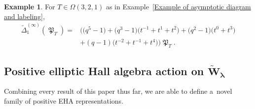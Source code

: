 \documentclass[pdftex]{sigma}
\numberwithin{equation}{section}
\theoremstyle{definition}
\newtheorem{Example}[Theorem]{Example}
\DeclareMathOperator{\MacD}{\mathfrak{P}}
\begin{document}
\begin{Example}
 For $T \in \Omega(3,2,1)$ as in Example~\ref{Example of asymptotic diagram and labeling},
 \begin{align*}
 \widetilde{\Delta}_{1}^{(\infty)}(\MacD_T) ={}& \bigl( \bigl(q^5-1\bigr) + \bigl(q^3-1\bigr)\bigl(t^{-1}+t^1+t^2\bigr) + \bigl(q^2-1\bigr)\bigl(t^0+t^3\bigr)\\
 &+ (q-1)\bigl(t^{-2}+t^{-1}+t^4\bigr)\bigr)\MacD_T.
 \end{align*}

\end{Example}


\subsection[Positive elliptic Hall algebra action on W\_lambda]{Positive elliptic Hall algebra action on $\boldsymbol{\widetilde{W}_{\lambda}}$}

Combining every result of this paper thus far, we are able to define a~novel family of positive EHA representations.
\end{document}
